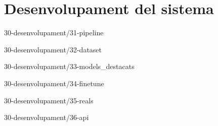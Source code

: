 \chapter{Desenvolupament del sistema}

{30-desenvolupament/31-pipeline}

{30-desenvolupament/32-dataset}

{30-desenvolupament/33-models_destacats}

{30-desenvolupament/34-finetune}

{30-desenvolupament/35-reals}

{30-desenvolupament/36-api}




\begin{comment}
3 Desenvolupament del sistema
    3.1 Arquitectura del sistema (pipeline)
    3.2 Creació dataset sintètic
    [?] 3.3 Creació de tests
    3.4 Fine-tune sintètic
    3.5 Dataset i fine-tune amb dades reals
        3.5.1 Estadístiques descriptives
        3.5.2 Tendències i patrons
        3.5.3 Problemes i incidències comunes
        3.5.4 Anomalies i valors atípics
    3.6 Desplegament API
\end{comment}
